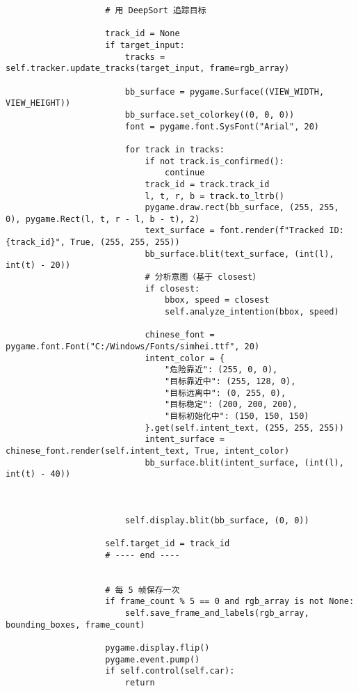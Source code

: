 \begin{lstlisting}
	                # 用 DeepSort 追踪目标
	
	                track_id = None
	                if target_input:
	                    tracks = self.tracker.update_tracks(target_input, frame=rgb_array)
	
	                    bb_surface = pygame.Surface((VIEW_WIDTH, VIEW_HEIGHT))
	                    bb_surface.set_colorkey((0, 0, 0))
	                    font = pygame.font.SysFont("Arial", 20)
	
	                    for track in tracks:
	                        if not track.is_confirmed():
	                            continue
	                        track_id = track.track_id
	                        l, t, r, b = track.to_ltrb()
	                        pygame.draw.rect(bb_surface, (255, 255, 0), pygame.Rect(l, t, r - l, b - t), 2)
	                        text_surface = font.render(f"Tracked ID: {track_id}", True, (255, 255, 255))
	                        bb_surface.blit(text_surface, (int(l), int(t) - 20))
	                        # 分析意图（基于 closest）
	                        if closest:
	                            bbox, speed = closest
	                            self.analyze_intention(bbox, speed)
	
	                        chinese_font = pygame.font.Font("C:/Windows/Fonts/simhei.ttf", 20)
	                        intent_color = {
	                            "危险靠近": (255, 0, 0),
	                            "目标靠近中": (255, 128, 0),
	                            "目标远离中": (0, 255, 0),
	                            "目标稳定": (200, 200, 200),
	                            "目标初始化中": (150, 150, 150)
	                        }.get(self.intent_text, (255, 255, 255))
	                        intent_surface = chinese_font.render(self.intent_text, True, intent_color)
	                        bb_surface.blit(intent_surface, (int(l), int(t) - 40))
	
	
	
	                    self.display.blit(bb_surface, (0, 0))
	
	                self.target_id = track_id
	                # ---- end ----
	
	
	                # 每 5 帧保存一次
	                if frame_count % 5 == 0 and rgb_array is not None:
	                    self.save_frame_and_labels(rgb_array, bounding_boxes, frame_count)
	
	                pygame.display.flip()
	                pygame.event.pump()
	                if self.control(self.car):
	                    return
	

\end{lstlisting}
